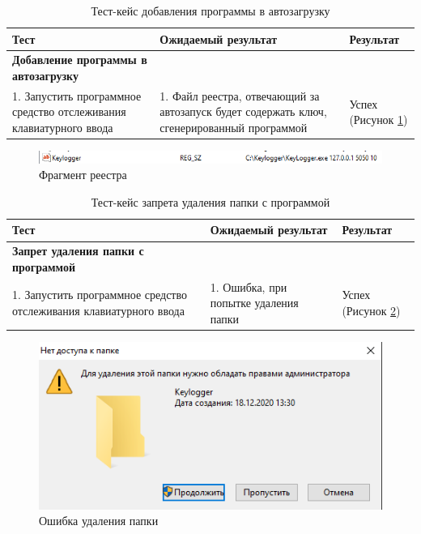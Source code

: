 \begin{table}[ht]
	\caption{Тест-кейс добавления программы в автозагрузку}
	\label{table:testing:func:test5}
	\centering
	  \begin{tabular}{| >{\raggedright}m{} 
					  | >{\raggedright}m{} 
					  | >{\raggedright\arraybackslash}m{}|}
	  \hline Тест & Ожидаемый результат  & Результат \\
	  \hline \textbf{Добавление программы в автозагрузку} \\ 1. Запустить программное средство отслеживания клавиатурного ввода & 1. Файл реестра, отвечающий за автозапуск будет содержать ключ, сгенерированный программой & Успех (Рисунок \ref*{sec:testing:func:autorun})\\
	  \hline
	  \end{tabular}
\end{table}

\begin{figure}[!hb]
	\centering
	  \includegraphics[scale=1]{attachments/autorun.png}  
	  \caption{ Фрагмент реестра }
	  \label{sec:testing:func:autorun}
\end{figure}

\begin{table}[htb]
	\caption{Тест-кейс запрета удаления папки с программой}
	\label{table:testing:func:test6}
	\centering
	  \begin{tabular}{| >{\raggedright}m{} 
					  | >{\raggedright}m{} 
					  | >{\raggedright\arraybackslash}m{}|}
	  \hline Тест & Ожидаемый результат  & Результат \\
	  \hline \textbf{Запрет удаления папки с программой} \\ 1. Запустить программное средство отслеживания клавиатурного ввода & 1. Ошибка, при попытке удаления папки & Успех (Рисунок \ref*{sec:testing:func:deleteerror})\\
	  \hline
	  \end{tabular}
\end{table}

\begin{figure}[htb]
	\centering
	  \includegraphics[scale=1]{attachments/delete.png}  
	  \caption{ Ошибка удаления папки }
	  \label{sec:testing:func:deleteerror}
\end{figure}

